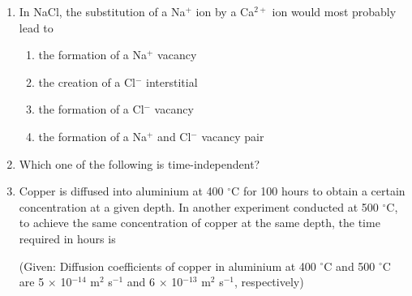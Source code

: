 \documentclass[journal]{IEEEtran}
\numberwithin{equation}{enumi}
\numberwithin{figure}{enumi}
\begin{document}
\begin{enumerate}
\item In NaCl, the substitution of a Na$^+$ ion by a Ca$^{2+}$ ion would most probably lead to

\begin{enumerate}
    \item the formation of a Na$^+$ vacancy
    \item the creation of a Cl$^-$ interstitial
    \item the formation of a Cl$^-$ vacancy
    \item the formation of a Na$^+$ and Cl$^-$ vacancy pair
\end{enumerate}
\bigskip

\item Which one of the following is time-independent?

\begin{enumerate}
\end{enumerate}
\bigskip

\item Copper is diffused into aluminium at 400 $^{\circ}$C for 100 hours to obtain a certain concentration at a given depth. In another experiment conducted at 500 $^{\circ}$C, to achieve the same concentration of copper at the same depth, the time required in hours is

(Given: Diffusion coefficients of copper in aluminium at 400 $^{\circ}$C and 500 $^{\circ}$C are 5 $\times$ 10$^{-14}$ m$^2$ s$^{-1}$ and 6 $\times$ 10$^{-13}$ m$^2$ s$^{-1}$, respectively)

\begin{enumerate}
\end{enumerate}


\end{enumerate}
\end{document}
